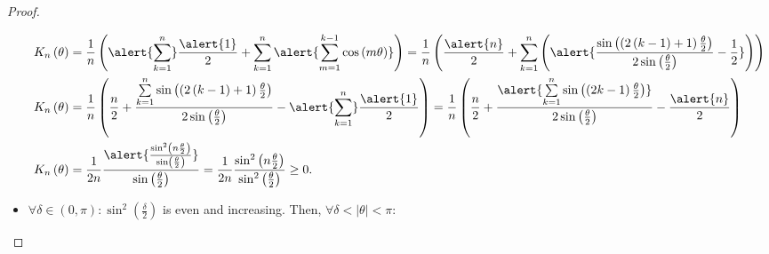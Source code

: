 \begin{frame}[allowframebreaks]
\begin{proof}
\begin{itemize}
			      \begin{align*}
				      K_{n}\left(\theta\right) & =
				      \frac{1}{n}
				      \left(
				      \alert{
					      \sum_{k=1}^{n}
				      }
				      \frac{\alert{1}}{2}+
				      \sum_{k=1}^{n}
				      \alert{
					      \sum_{m=1}^{k-1}
					      \cos\left(m\theta\right)
				      }
				      \right)
				      =
				      \frac{1}{n}
				      \left(
				      \frac{\alert{n}}{2}+
				      \sum_{k=1}^{n}
				      \left(
					      \alert{
						      \frac{
							      \sin
							      \left(
							      \left(2\left(k-1\right)+1\right)
							      \frac{\theta}{2}
							      \right)
						      }{
							      2\sin\left(\frac{\theta}{2}\right)
						      }-\frac{1}{2}
					      }
					      \right)
				      \right)                      \\
				      K_{n}\left(\theta\right) & =
				      \frac{1}{n}
				      \left(
				      \frac{n}{2}+
				      \frac{
						      \sum\limits_{k=1}^{n}
						      \sin
						      \left(
						      \left(2\left(k-1\right)+1\right)
						      \frac{\theta}{2}
						      \right)
					      }{
						      2\sin\left(\frac{\theta}{2}\right)
					      }-
				      \alert{
						      \sum_{k=1}^{n}
					      }
				      \frac{\alert{1}}{2}
				      \right)
				      =
				      \frac{1}{n}
				      \left(
				      \frac{n}{2}+
				      \frac{
					      \alert{
						      \sum\limits_{k=1}^{n}
						      \sin\left(\left(2k-1\right)\frac{\theta}{2}\right)
					      }
				      }{
					      2\sin\left(\frac{\theta}{2}\right)
				      }
				      -\frac{\alert{n}}{2}
				      \right)                      \\
				      K_{n}\left(\theta\right) & =
				      \frac{1}{2n}
				      \frac{
					      \alert{
						      \frac{
							      \sin^{2}\left(n\frac{\theta}{2}\right)
						      }{
							      \sin\left(\frac{\theta}{2}\right)
						      }
					      }
				      }{\sin\left(\frac{\theta}{2}\right)}=
				      \frac{1}{2n}
				      \frac{
					      \sin^{2}\left(n\frac{\theta}{2}\right)
				      }{
					      \sin^{2}\left(\frac{\theta}{2}\right)
				      }
				      \geq0.
			      \end{align*}

			\item

			      \begin{math}
				      \forall\delta\in\left(0,\pi\right):
				      \sin^{2}\left(\frac{\delta}{2}\right)
			      \end{math}
			      is \alert{even} and increasing.
			      Then,
			      \begin{math}
				      \forall
				      \delta<
				      \left|\theta\right|
				      <\pi
			      \end{math}:


\end{itemize}
\end{proof}
\end{frame}
